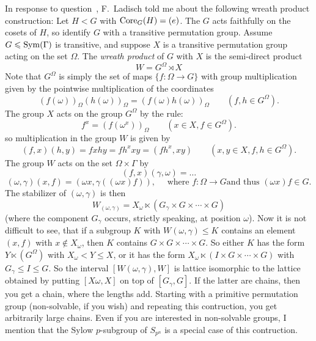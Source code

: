 In response to question~\cite{MO62495}, F.~Ladisch told me about the following
wreath product construction:
Let $H < G$ with $\mathrm{Core}_G(H) =  (e)$.  The $G$ acts faithfully on the cosets of
$H$, so identify $G$ with a transitive permutation group. Assume $G \leqslant
\operatorname{Sym}(\Gamma)$ is transitive, and suppose $X$ is a transitive permutation group
acting on the set $\Omega$. The \emph{wreath product}
of $G$ with $X$ is the semi-direct product 
\[
W=G^{\Omega} \rtimes X 
\]
Note that $G^{\Omega}$ is simply the set of maps $\{f:\Omega \rightarrow G\}$
with group multiplication given by the pointwise multiplication of the
coordinates 
\[
(f(\omega))_{\Omega} (h(\omega))_{\Omega} = (f(\omega) h(\omega))_{\Omega}  
\qquad (f, h \in G^\Omega).
\]
The group $X$ acts on the group $G^{\Omega}$ by the rule:
\[
f^x = (f(\omega^x))_{\Omega} \qquad (x\in X, f\in G^\Omega).
\]
so multiplication in the group $W$ is given by
\[
(f,x) (h,y) = fxhy = f h^x x y =(f h^x, x y) \qquad (x, y \in X, f, h\in G^\Omega).
\]
The group $W$ acts on the set $\Omega \times \Gamma$ by 
\[
(f,x) (\gamma, \omega) = \dots
\]
\[
(\omega, \gamma)(x,f) =  
(\omega x, \gamma((\omega x)f)), \quad \text{ where $f: \Omega \rightarrow G$
  and thus $(\omega x) f \in G$.}
\]
The stabilizer of $(\omega, \gamma)$ is then 
\[
W_{(\omega, \gamma)} = X_\omega \ltimes (G_\gamma \times G \times \cdots \times G)
\]
(where the component $G_\gamma$ occurs, strictly speaking, at position $\omega$). 
Now it is not difficult to see, that if a subgroup $K$ with 
$W(\omega, \gamma)\leq K$ contains an element $(x,f)$ with $x\notin X_\omega$,
then $K$ contains $G\times G\times \cdots \times G$. So either $K$ has the form
$Y\ltimes (G^\Omega)$ with $X_\omega < Y\leq X$, or it has the form
$X_\omega\ltimes (I\times G\times \cdots \times G)$ with $G_\gamma \leq I \leq G$.
So the interval $[W(\omega,\gamma),W]$ is lattice isomorphic to the lattice
obtained by putting $[X\omega,X]$ on top of $[G_\gamma,G]$. If the latter are
chains, then you get a chain, where the lengths add. Starting with a primitive
permutation group (non-solvable, if you wish) and repeating this contruction,
you get arbitrarily large chains. Even if you are interested in non-solvable
groups, I mention that the Sylow $p$-subgroup of $S_{p^n}$ is a special case of
this contruction.  
